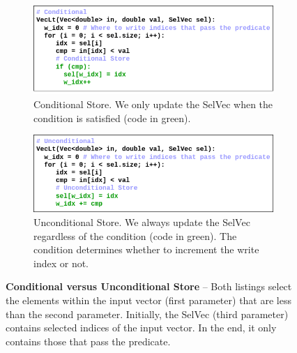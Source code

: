 \documentclass[12pt]{cmuthesis}
\begin{document}
\begin{figure}[t!]
\centering
\hspace*{\fill}%
\begin{subfigure}[t]{.8\linewidth}
 \centering
 \includegraphics[width=0.9\linewidth]{images/ConditionalStoreConditional.png}
 \caption{Conditional Store. We only update the SelVec when the condition is satisfied (code in green).}
  \label{fig:conditional_store}
\end{subfigure}%
\hspace*{\fill}%
\vspace*{8pt}%

\hspace*{\fill}%

\begin{subfigure}[t]{.8\linewidth}
 \centering
 \includegraphics[width=0.9\linewidth]{images/ConditionalStoreUnconditional.png}
 \caption{Unconditional Store. We always update the SelVec regardless of the condition (code in green). The condition determines whether to increment the write index or not.}
  \label{fig:unconditional_store}
\end{subfigure}
\caption{\textbf{Conditional versus Unconditional Store} -- Both listings select the elements within the input vector (first parameter) that are less than the second parameter. Initially, the SelVec (third parameter) contains selected indices of the input vector. In the end, it only contains those that pass the predicate.}
\label{fig:conditional_selvec}
\end{figure}
\end{document}

